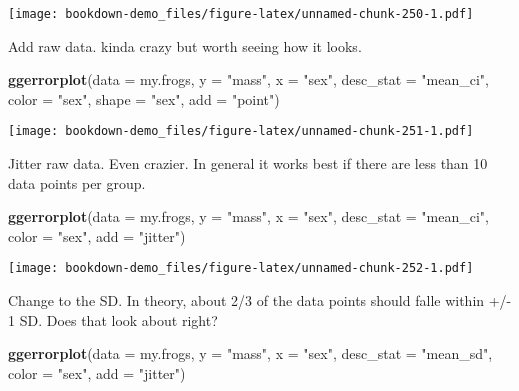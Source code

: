 \documentclass[]{book}
\newenvironment{Shaded}{\begin{snugshade}}{\end{snugshade}}
\newcommand{\KeywordTok}[1]{\textcolor[rgb]{0.13,0.29,0.53}{\textbf{#1}}}
\newcommand{\DataTypeTok}[1]{\textcolor[rgb]{0.13,0.29,0.53}{#1}}
\newcommand{\StringTok}[1]{\textcolor[rgb]{0.31,0.60,0.02}{#1}}
\newcommand{\NormalTok}[1]{#1}
\theoremstyle{definition}
\theoremstyle{definition}
\theoremstyle{definition}
\theoremstyle{remark}
\begin{document}
\texttt{[image: bookdown-demo\_files/figure-latex/unnamed-chunk-250-1.pdf]}

Add raw data. kinda crazy but worth seeing how it looks.

\begin{Shaded}
\begin{Highlighting}[]
\KeywordTok{ggerrorplot}\NormalTok{(}\DataTypeTok{data =}\NormalTok{ my.frogs,}
          \DataTypeTok{y =} \StringTok{"mass"}\NormalTok{,}
          \DataTypeTok{x =} \StringTok{"sex"}\NormalTok{,}
          \DataTypeTok{desc_stat =} \StringTok{"mean_ci"}\NormalTok{,}
          \DataTypeTok{color =} \StringTok{"sex"}\NormalTok{,}
          \DataTypeTok{shape =} \StringTok{"sex"}\NormalTok{,}
          \DataTypeTok{add =} \StringTok{"point"}\NormalTok{)}
\end{Highlighting}
\end{Shaded}

\texttt{[image: bookdown-demo\_files/figure-latex/unnamed-chunk-251-1.pdf]}

Jitter raw data. Even crazier. In general it works best if there are
less than 10 data points per group.

\begin{Shaded}
\begin{Highlighting}[]
\KeywordTok{ggerrorplot}\NormalTok{(}\DataTypeTok{data =}\NormalTok{ my.frogs,}
          \DataTypeTok{y =} \StringTok{"mass"}\NormalTok{,}
          \DataTypeTok{x =} \StringTok{"sex"}\NormalTok{,}
          \DataTypeTok{desc_stat =} \StringTok{"mean_ci"}\NormalTok{,}
          \DataTypeTok{color =} \StringTok{"sex"}\NormalTok{,}
          \DataTypeTok{add =} \StringTok{"jitter"}\NormalTok{)}
\end{Highlighting}
\end{Shaded}

\texttt{[image: bookdown-demo\_files/figure-latex/unnamed-chunk-252-1.pdf]}

Change to the SD. In theory, about 2/3 of the data points should falle
within +/- 1 SD. Does that look about right?

\begin{Shaded}
\begin{Highlighting}[]
\KeywordTok{ggerrorplot}\NormalTok{(}\DataTypeTok{data =}\NormalTok{ my.frogs,}
          \DataTypeTok{y =} \StringTok{"mass"}\NormalTok{,}
          \DataTypeTok{x =} \StringTok{"sex"}\NormalTok{,}
          \DataTypeTok{desc_stat =} \StringTok{"mean_sd"}\NormalTok{,}
          \DataTypeTok{color =} \StringTok{"sex"}\NormalTok{,}
          \DataTypeTok{add =} \StringTok{"jitter"}\NormalTok{)}
\end{Highlighting}
\end{Shaded}
\end{document}
